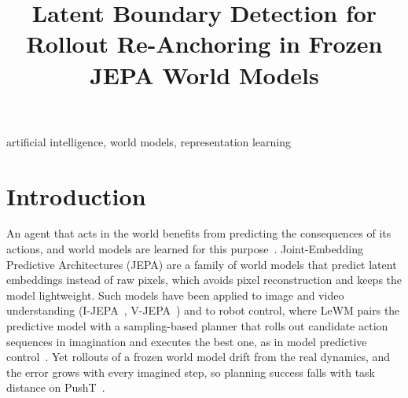 \documentclass[conference]{IEEEtran}
\begin{document}
\title{Latent Boundary Detection for Rollout Re-Anchoring in Frozen JEPA World Models}

\author{
\and
{}
}

\maketitle

\begin{abstract}
\end{abstract}

\begin{IEEEkeywords}
artificial intelligence, world models,  representation learning
\end{IEEEkeywords}

\section{Introduction}
An agent that acts in the world benefits from predicting the consequences of its actions, and
world models are learned for this purpose~\cite{lecun2022path}. Joint-Embedding Predictive
Architectures (JEPA) are a family of world models that predict latent embeddings instead of raw
pixels, which avoids pixel reconstruction and keeps the model lightweight. Such models have
been applied to image and video understanding (I-JEPA~\cite{assran2023ijepa}, V-JEPA~\cite{vjepa2024})
and to robot control, where LeWM pairs the predictive model with a sampling-based planner
that rolls out candidate action sequences in imagination and executes the best one, as in
model predictive control~\cite{lewm2026}. Yet rollouts of a frozen world model drift from the
real dynamics, and the error grows with every imagined step, so planning success falls with
task distance on PushT~\cite{mindthegap2026}.
\end{document}
